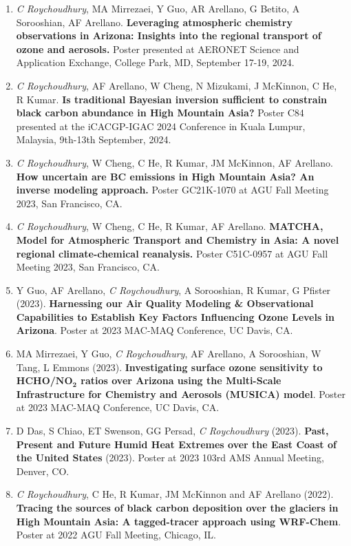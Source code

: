 \documentclass[margin,line]{resume}
\begin{document}
\begin{resume}
\begin{enumerate}[topsep=1pt, partopsep=1pt, itemsep=0.5pt, parsep=0.1pt, leftmargin=15pt,label=\arabic*.]
			\item \textit{C Roychoudhury}, MA Mirrezaei, Y Guo, AR Arellano, G Betito, A Sorooshian, AF Arellano.  \textbf{Leveraging atmospheric chemistry observations in Arizona: Insights into the regional transport of ozone and aerosols.} Poster presented at AERONET Science and Application Exchange, College Park, MD, September 17-19, 2024.
			
			\item \textit{C Roychoudhury}, AF Arellano, W Cheng, N Mizukami, J McKinnon, C He, R Kumar. \textbf{Is traditional Bayesian inversion sufficient to constrain black carbon abundance in High Mountain Asia?} Poster C84 presented at the iCACGP-IGAC 2024 Conference in Kuala Lumpur, Malaysia, 9th-13th September, 2024.
			
			\item \textit{C Roychoudhury}, W Cheng, C He, R Kumar, JM McKinnon, AF Arellano. \textbf{How uncertain are BC emissions in High Mountain Asia? An inverse modeling approach.} Poster GC21K-1070 at AGU Fall Meeting 2023, San Francisco, CA. 
			
			\item \textit{C Roychoudhury}, W Cheng, C He, R Kumar, AF Arellano. \textbf{MATCHA, Model for Atmospheric Transport and Chemistry in Asia: A novel regional climate-chemical reanalysis.} Poster C51C-0957 at AGU Fall Meeting 2023, San Francisco, CA.
			
			\item Y Guo, AF Arellano, \textit{C Roychoudhury}, A Sorooshian, R Kumar, G Pfister (2023). \textbf{Harnessing our Air Quality Modeling \& Observational Capabilities to Establish Key Factors Influencing Ozone Levels in Arizona}. Poster at 2023 MAC-MAQ Conference, UC Davis, CA.
			
			\item MA Mirrezaei, Y Guo, \textit{C Roychoudhury}, AF Arellano, A Sorooshian, W Tang, L Emmons (2023). \textbf{Investigating surface ozone sensitivity to HCHO/$\mathbf{NO_2}$ ratios over Arizona using the Multi-Scale Infrastructure for Chemistry and Aerosols (MUSICA) model}. Poster at 2023 MAC-MAQ Conference, UC Davis, CA.
			
			\item D Das, S Chiao, ET Swenson, GG Persad, \textit{C Roychoudhury} (2023). \textbf{Past, Present and Future Humid Heat Extremes over the East Coast of the United States} (2023). Poster at 2023 103rd AMS Annual Meeting, Denver, CO. 
			
			\item \textit{C Roychoudhury}, C He, R Kumar, JM McKinnon and AF Arellano (2022).
			\textbf{Tracing the sources of black carbon deposition over the glaciers in High Mountain Asia: A tagged-tracer approach using WRF-Chem}. Poster at 2022 AGU Fall Meeting, Chicago, IL.
			

\end{enumerate}
\end{resume}
\end{document}
